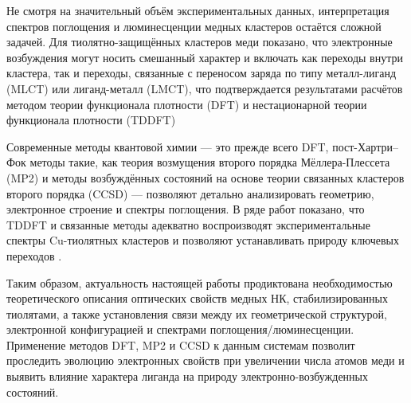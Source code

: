 \documentclass[a4paper,12pt]{article}
\begin{document}
\begin{onehalfspace}
	Не смотря на значительный объём экспериментальных данных, интерпретация спектров поглощения и люминесценции медных кластеров остаётся сложной задачей. Для тиолятно-защищённых кластеров меди показано, что электронные возбуждения могут носить смешанный характер и включать как переходы внутри кластера, так и переходы, связанные с переносом заряда по типу металл-лиганд (MLCT) или лиганд-металл (LMCT), что подтверждается результатами расчётов методом теории функционала плотности (DFT) и нестационарной теории функционала плотности (TDDFT) \cite{PENG2021138898}
	
	Современные методы квантовой химии — это прежде всего DFT, пост-Хартри–Фок методы такие, как теория возмущения второго порядка Мёллера-Плессета (MP2) и методы возбуждённых состояний на основе теории связанных кластеров второго порядка (CCSD) — позволяют детально анализировать геометрию, электронное строение и спектры поглощения. В ряде работ показано, что TDDFT и связанные методы адекватно воспроизводят экспериментальные спектры Cu-тиолятных кластеров и позволяют устанавливать природу ключевых переходов \cite{Buglak2019,}.
	
	Таким образом, актуальность настоящей работы продиктована необходимостью теоретического описания оптических свойств медных НК, стабилизированных тиолятами, а также установления связи между их геометрической структурой, электронной конфигурацией и спектрами поглощения/люминесценции. Применение методов DFT, MP2 и CCSD к данным системам позволит проследить эволюцию электронных свойств при увеличении числа атомов меди и выявить влияние характера лиганда на природу электронно-возбужденных состояний.
	

\end{onehalfspace}
\end{document}
